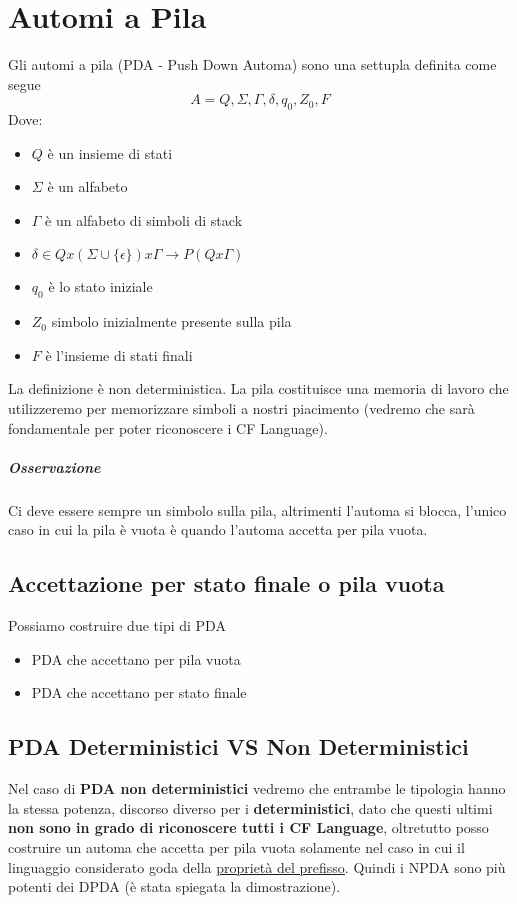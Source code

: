 \chapter{Automi a Pila}
Gli automi a pila (PDA - Push Down Automa) sono una settupla definita come segue
\begin{equation*}
    A={Q, \Sigma, \Gamma, \delta, q_0, Z_0, F}
\end{equation*}
Dove:
\begin{itemize}
    \item $Q$ è un insieme di stati
    \item $\Sigma$ è un alfabeto
    \item $\Gamma$ è un alfabeto di simboli di stack
    \item $\delta \in Q x (\Sigma \cup \{\epsilon\}) x \Gamma \rightarrow P(Q x \Gamma)$ 
    \item $q_0$ è lo stato iniziale
    \item $Z_0$ simbolo inizialmente presente sulla pila
    \item $F$ è l'insieme di stati finali
\end{itemize}
La definizione è non deterministica.
La pila costituisce una memoria di lavoro che utilizzeremo per memorizzare simboli a nostri piacimento
(vedremo che sarà fondamentale per poter riconoscere i CF Language).
\paragraph{Osservazione}Ci deve essere sempre un simbolo sulla pila, altrimenti l'automa si blocca, l'unico caso in
cui la pila è vuota è quando l'automa accetta per pila vuota.
\section{Accettazione per stato finale o pila vuota}
Possiamo costruire due tipi di PDA
\begin{itemize}
    \item PDA che accettano per pila vuota
    \item PDA che accettano per stato finale
\end{itemize}
\section{PDA Deterministici VS Non Deterministici}
Nel caso di \textbf{PDA non deterministici} vedremo che entrambe le tipologia hanno la stessa potenza,
discorso diverso per i \textbf{deterministici}, dato che questi ultimi \textbf{non sono in grado di riconoscere tutti i CF Language},
oltretutto posso costruire un automa che accetta per pila vuota solamente nel caso in cui il linguaggio
considerato goda della \hyperref[sec:Prefix-Free]{proprietà del prefisso}.
Quindi i NPDA sono più potenti dei DPDA (è stata spiegata la dimostrazione).

